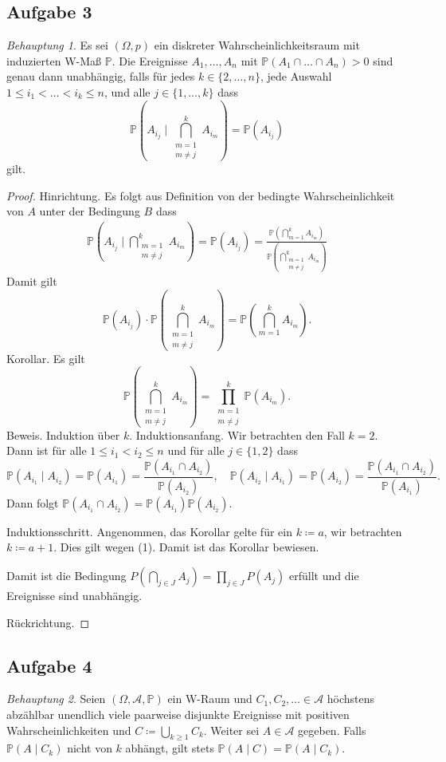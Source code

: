 \documentclass[fleqn,draft,a5paper]{article}
\theoremstyle{remark}
\newtheorem*{Behauptung}{Behauptung}
\newcommand{\cP}{\mathbb{P}}
\begin{document}
\subsection{Aufgabe 3}
\begin{Behauptung}
Es sei $(\Omega, p)$ ein diskreter Wahrscheinlichkeitsraum mit induzierten
W-Maß $\cP$.  Die Ereignisse $A_{1}, \ldots, A_{n}$ mit $\cP(A_{1} \cap \ldots \cap A_{n})
>0 $ sind genau dann unabhängig, falls für jedes $k \in \{2, \ldots, n\}$,
jede Auswahl $1 \le i_{1} < \ldots < i_{k} \le n$, und alle $j \in \{1, \ldots, k\}$
dass
\[ \cP(A_{i_{j}}\mid \bigcap_{\substack{m=1 \\ m \ne j}}^{k}A_{i_{m}}) =
    \cP(A_{i_{j}})
\]
gilt.  
\end{Behauptung}
\begin{proof}
  Hinrichtung.  Es folgt aus Definition von der bedingte
  Wahrscheinlichkeit von $A$ unter der Bedingung $B$ dass
  \begin{align*}
    \cP(A_{i_{j}}\mid \bigcap_{\substack{m=1 \\ m \ne j}}^{k}A_{i_{m}}) =
    \cP(A_{i_{j}}) 
    = \frac{\cP(\bigcap_{m=1}^{k}A_{i_{m}})}{\cP(\bigcap_{\substack{m=1 \\ m \ne j}}^{k}A_{i_{m}})}
  \end{align*}
  Damit gilt
  \[\cP(A_{i_{j}})  \cdot \cP(\bigcap_{\substack{m=1 \\ m \ne j}}^{k}A_{i_{m}}) =
    \cP(\bigcap_{m=1}^{k}A_{i_{m}}). \tag{1}\]
  Korollar.  Es gilt \[
    \cP(\bigcap_{\substack{m=1 \\ m \ne j}}^{k}A_{i_{m}}) = \prod_{\substack{m=1 \\
      m \ne j}}^{k} \cP(A_{i_{m}}).
\]
Beweis.  Induktion über $k$.
Induktionsanfang. Wir betrachten den Fall $k = 2$.  Dann ist für alle $1
  \le i_{1}  < i_{2} \le n$ und für alle $j \in \{1, 2\}$ dass
  \[\cP(A_{i_{1}} \mid A_{i_{2}}) = \cP(A_{i_{1}}) = \frac{\cP(A_{i_{1}}
      \cap A_{i_{2}})}{\cP(A_{i_{2}})}, \quad \cP(A_{i_{2}} \mid
    A_{i_{1}}) = \cP(A_{i_{2}}) = \frac{\cP(A_{i_{1}}
      \cap A_{i_{2}})}{\cP(A_{i_{1}})}.\]
  Dann folgt $\cP(A_{i_{1}} \cap A_{i_{2}}) = \cP(A_{i_{1}})\cP(A_{i_{2}})$.

  Induktionsschritt. Angenommen, das Korollar gelte für ein $k \coloneq a$, wir
  betrachten $k \coloneq a+1$.  Dies gilt wegen (1).  Damit ist das Korollar
  bewiesen.

  Damit ist die Bedingung $P(\bigcap_{j \in J} A_{j}) = \prod_{j \in J}P(A_{j})$
  erfüllt und die Ereignisse sind unabhängig.

  Rückrichtung.
\end{proof}
\subsection{Aufgabe 4}
\begin{Behauptung}
  Seien $(\Omega, \mathcal{A}, \cP)$ ein W-Raum und $C_{1}, C_{2}, \ldots \in \mathcal{A}$ höchstens
  abzählbar unendlich viele paarweise disjunkte Ereignisse mit
  positiven Wahrscheinlichkeiten und $C \coloneq \bigcup_{k \ge 1}C_{k}$.  Weiter
  sei $A \in \mathcal{A}$ gegeben.  Falls $\cP(A \mid C_{k})$ nicht von $k$ abhängt,
  gilt stets $\cP(A \mid C) = \cP(A \mid C_{k})$.
\end{Behauptung}
\end{document}
